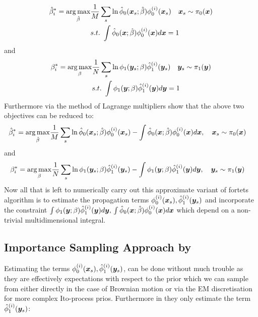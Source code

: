 \documentclass[a4paper,12pt,twoside,openright]{report}
\theoremstyle{definition}
\begin{document}
\begin{align}
    \hat{\beta}^*_i = \operatorname*{arg\,max}_{\hat{\beta} } &\frac{1}{M} \sum_s \operatorname{ln} {\hat{\phi}}_0({\bm{x}}_s; \hat{\beta} )   \phi_0^{(i)}({\bm{x}}_s)
    \quad {\bm{x}}_s\sim \pi_0({\bm{x}}) \nonumber \\
   & s.t. \text{ }  \int {\hat{\phi}}_0({\bm{x}}; \hat{\beta} )   \phi_0^{(i)}({\bm{x}}) d{\bm{x}} =1
\end{align}
and
\begin{align}
    {\beta}^*_i = \operatorname*{arg\,max}_{{\beta} } &\frac{1}{N} \sum_s \operatorname{ln} \phi_1({\bm{y}}_s; {\beta} )   {\hat{\phi}}_1^{(i)}({\bm{y}}_s)
    \quad {\bm{y}}_s\sim \pi_1({\bm{y}}) \nonumber \\
   & s.t. \text{ }  \int \phi_1({\bm{y}}; {\beta} )   {\hat{\phi}}_1^{(i)}({\bm{y}}) d{\bm{y}} =1
\end{align}
Furthermore via the method of Lagrange multipliers \cite{pavon1991free} show that the above two objectives can be reduced to:
\begin{align}
    \hat{\beta}^*_i = \operatorname*{arg\,max}_{\hat{\beta} } &\frac{1}{M} \sum_s \operatorname{ln} {\hat{\phi}}_0({\bm{x}}_s; \hat{\beta} )   \phi_0^{(i)}({\bm{x}}_s)- \int {\hat{\phi}}_0({\bm{x}}; \hat{\beta} )   \phi_0^{(i)}({\bm{x}}) d{\bm{x}} ,
    \quad {\bm{x}}_s\sim \pi_0({\bm{x}})   \nonumber 
\end{align}
and
\begin{align}
    {\beta}^*_i = \operatorname*{arg\,max}_{{\beta} } &\frac{1}{N} \sum_s \operatorname{ln} \phi_1({\bm{y}}_s; {\beta} )   {\hat{\phi}}_1^{(i)}({\bm{y}}_s)- \int \phi_1({\bm{y}}; {\beta} )   {\hat{\phi}}_1^{(i)}({\bm{y}}) d{\bm{y}} ,
    \quad {\bm{y}}_s\sim \pi_1({\bm{y}}) \nonumber 
\end{align}
Now all that is left to numerically carry out this approximate variant of fortets algorithm is to estimate the propagation terms $ \phi_0^{(i)}({\bm{x}}_s), {\hat{\phi}}_1^{(i)}({\bm{y}}_s)$ and incorporate the constraint $\int \phi_1({\bm{y}}; {\beta} )   {\hat{\phi}}_1^{(i)}({\bm{y}}) d{\bm{y}}, \, \int {\hat{\phi}}_0({\bm{x}}; \hat{\beta} )   \phi_0^{(i)}({\bm{x}}) d{\bm{x}} $ which depend on a non-trivial multidimensional integral.


\subsection{Importance Sampling Approach by \citet{pavon2018data} }

Estimating the terms $ \phi_0^{(i)}({\bm{x}}_s), {\hat{\phi}}_1^{(i)}({\bm{y}}_s)$, can be done without much trouble as they are effectively expectations with respect to the prior which we can sample from either directly in the case of Brownian motion or via the EM discretisation for more complex Ito-process prios. Furthermore in \cite{pavon1991free} they only estimate the term ${\hat{\phi}}_1^{(i)}({\bm{y}}_s)$:
\end{document}
